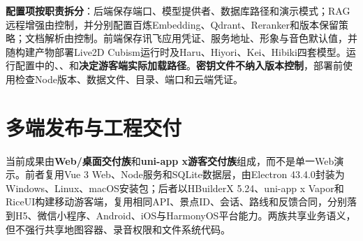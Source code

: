 \textbf{配置项按职责拆分}：后端保存端口、模型提供者、数据库路径和演示模式；RAG远程增强由控制，并分别配置百炼Embedding、Qdrant、Reranker和版本保留策略；文档解析由控制。前端保存讯飞应用凭证、服务地址、形象与音色默认值，并随构建产物部署Live2D Cubism运行时及Haru、Hiyori、Kei、Hibiki四套模型。运行配置中的、、和\textbf{决定游客端实际加载路径}。\textbf{密钥文件不纳入版本控制}，部署前使用检查Node版本、数据文件、目录、端口和云端凭证。

\newpage
\section{多端发布与工程交付}\label{sec:multiplatform-delivery}

当前成果由\textbf{Web/桌面交付族}和\textbf{uni-app x游客交付族}组成，而不是单一Web演示。前者复用Vue 3 Web、Node服务和SQLite数据层，由Electron 43.4.0封装为Windows、Linux、macOS安装包；后者以HBuilderX 5.24、uni-app x Vapor和RiceUI构建移动游客端，复用相同API、景点ID、会话、路线和反馈合同，分别落到H5、微信小程序、Android、iOS与HarmonyOS平台能力。两族共享业务语义，但不强行共享地图容器、录音权限和文件系统代码。

